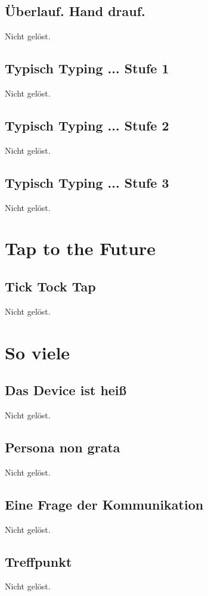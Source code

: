 \documentclass[12pt,a4paper,titlepage,oneside]{scrartcl}
\begin{document}
\subsection{\"Uberlauf. Hand drauf.}
Nicht gelöst.

\subsection{Typisch Typing ... Stufe 1}
Nicht gelöst.

\subsection{Typisch Typing ... Stufe 2}
Nicht gelöst.

\subsection{Typisch Typing ... Stufe 3}
Nicht gelöst.


\section{Tap to the Future}

\subsection{Tick Tock Tap}
Nicht gelöst.


\section{So viele}

\subsection{Das Device ist heiß}
Nicht gelöst.

\subsection{Persona non grata}
Nicht gelöst.

\subsection{Eine Frage der Kommunikation}
Nicht gelöst.

\subsection{Treffpunkt}
Nicht gelöst.
\end{document}
